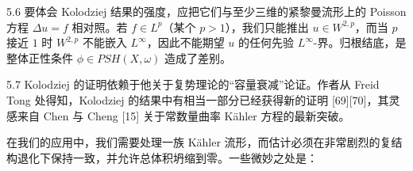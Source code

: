 
\begin{remark}{5.6}
要体会 Kolodziej 结果的强度，应把它们与至少三维的紧黎曼流形上的 Poisson 方程 $\Delta u=f$ 相对照。若 $f\in L^p$（某个 $p>1$），我们只能推出 $u\in W^{2,p}$，而当 $p$ 接近 $1$ 时 $W^{2,p}$ 不能嵌入 $L^\infty$，因此不能期望 $u$ 的任何先验 $L^\infty$-界。归根结底，是整体正性条件 $\phi\in PSH(X,\omega)$ 造成了差别。
\end{remark}

\begin{remark}{5.7}
Kolodziej 的证明依赖于他关于复势理论的“容量衰减”论证。作者从 Freid Tong 处得知，Kolodziej 的结果中有相当一部分已经获得新的证明 [69][70]，其灵感来自 Chen 与 Cheng [15] 关于常数量曲率 Kähler 方程的最新突破。
\end{remark}


在我们的应用中，我们需要处理一族 Kähler 流形，而估计必须在非常剧烈的复结构退化下保持一致，并允许总体积坍缩到零。一些微妙之处是：
